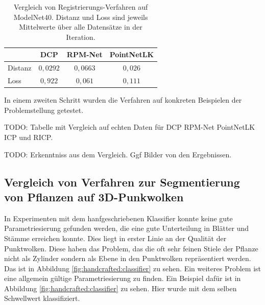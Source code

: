 \documentclass[12pt,titlepage, twoside]{article}
\begin{document}
\begin{table}
\begin{center}
\begin{tabular}{|l || c | c | c | } 
    \hline
     & DCP & RPM-Net & PointNetLK \\  
    \hline
    \hline
    Distanz & $0,0292$ & $0,0663$& $0,026$\\
    \hline
    Loss & $0,922$& $0,061$& $0,111$\\
    \hline
\end{tabular}
\end{center}
\caption{Vergleich von Registrierungs-Verfahren auf ModelNet40. Distanz und Loss sind jeweils Mittelwerte über alle Datensätze in der Iteration.}
\label{tab:registration:deeplearn:compare}
\end{table}

In einem zweiten Schritt wurden die Verfahren auf konkreten Beispielen der Problemstellung getestet. 

TODO: Tabelle mit Vergleich auf echten Daten für DCP RPM-Net PointNetLK ICP und RICP.

TODO: Erkenntniss aus dem Vergleich. Ggf Bilder von den Ergebnissen.

\subsection{Vergleich von Verfahren zur Segmentierung von Pflanzen auf 3D-Punkwolken}

In Experimenten mit dem hanfgeschriebenen Klassifier konnte keine gute Parametriesierung gefunden werden, die eine gute Unterteilung in Blätter und Stämme erreichen konnte. Dies liegt in erster Linie an der Qualität der Punktwolken.
Diese haben das Problem, das die oft sehr feinen Stiele der Pflanze nicht als Zylinder sondern als Ebene in den Punktwolken repräsentiert werden. Das ist in Abbildung \ref{fig:handcrafted:classifier} zu sehen.
Ein weiteres Problem ist eine allgemein gültige Parametriesierung zu finden. Ein Beispiel dafür ist in Abbildung \ref{fig:handcrafted:classifier} zu sehen. Hier wurde mit dem selben Schwellwert klassifiziert.
\end{document}
